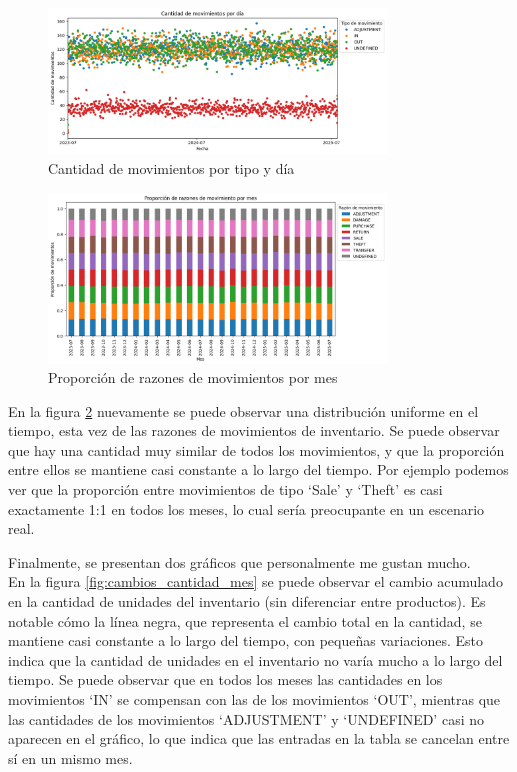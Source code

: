\begin{figure}[H]
    \centering
    \includegraphics[width=0.8\textwidth]{imagenes/datos_uniformes/movimientos_por_tipo_y_dia.png}
    \caption{Cantidad de movimientos por tipo y día}
    \label{fig:movimientos_por_tipo_y_dia}
\end{figure}

\begin{figure}[H]
    \centering
    \includegraphics[width=0.8\textwidth]{imagenes/datos_uniformes/razones_de_movimientos.png}
    \caption{Proporción de razones de movimientos por mes}
    \label{fig:razones_de_movimientos}
\end{figure}

En la figura \ref{fig:razones_de_movimientos} nuevamente se puede observar una distribución uniforme en el tiempo, esta vez de las razones de movimientos de inventario. Se puede observar que hay una cantidad muy similar de todos los movimientos, y que la proporción entre ellos se mantiene casi constante a lo largo del tiempo. Por ejemplo podemos ver que la proporción entre movimientos de tipo `Sale' y `Theft' es casi exactamente 1:1 en todos los meses, lo cual sería preocupante en un escenario real.

Finalmente, se presentan dos gráficos que personalmente me gustan mucho. \\
En la figura \ref{fig:cambios_cantidad_mes} se puede observar el cambio acumulado en la cantidad de unidades del inventario (sin diferenciar entre productos). Es notable cómo la línea negra, que representa el cambio total en la cantidad, se mantiene casi constante a lo largo del tiempo, con pequeñas variaciones. Esto indica que la cantidad de unidades en el inventario no varía mucho a lo largo del tiempo. Se puede observar que en todos los meses las cantidades en los movimientos `IN' se compensan con las de los movimientos `OUT', mientras que las cantidades de los movimientos `ADJUSTMENT' y `UNDEFINED' casi no aparecen en el gráfico, lo que indica que las entradas en la tabla se cancelan entre sí en un mismo mes.

